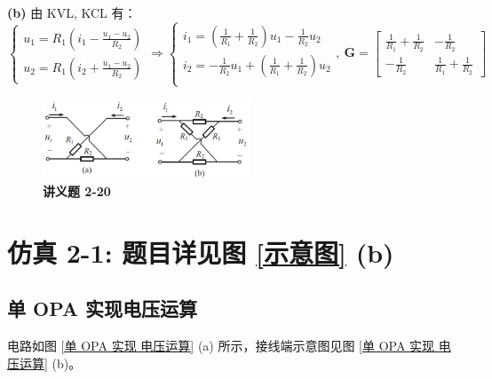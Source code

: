 \documentclass[UTF8]{report}
\theoremstyle{MyLineTheoremStyle} %
\theoremstyle{MyBlockTheoremStyle} %
\theoremstyle{MySubsubsectionStyle} %
\begin{document}
\textbf{(b)} 由 KVL, KCL 有：
\begin{equation}
\begin{cases}
    u_1 = R_1\left( i_1 - \frac{u_1 - u_2}{R_2} \right)\\
    u_2 = R_1 \left( i_2 + \frac{u_1 - u_2}{R_2} \right)
\end{cases}\Longrightarrow  
\begin{cases}
    i_1 = \left( \frac{1}{R_1} + \frac{1}{R_2} \right)u_1 - \frac{1}{R_2}u_2 \\ 
    i_2 =  - \frac{1}{R_2}u_1  + \left( \frac{1}{R_1} + \frac{1}{R_2} \right)u_2\\ 
\end{cases},\ 
\boldsymbol{G} = 
\begin{bmatrix}
    \frac{1}{R_1} + \frac{1}{R_2} & -\frac{1}{R_2} \\ 
    -\frac{1}{R_2} & \frac{1}{R_1} + \frac{1}{R_2}
\end{bmatrix}
\end{equation}

\begin{figure}[H]\centering
\includegraphics[width=0.55\textwidth]{assets/3/image (8).jpg}
\caption{\bfseries 讲义题 2-20}\label{讲义题 2-20}
\end{figure}

\section{仿真 2-1: 题目详见图 \ref{示意图} (b)}

\subsection{单 OPA 实现电压运算}

电路如图 \ref{单 OPA 实现 电压运算} (a) 所示，接线端示意图见图 \ref{单 OPA 实现 电压运算} (b)。
\end{document}
